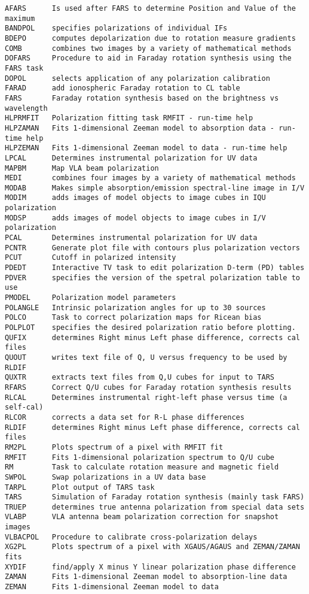 \vskip 0.5pt
\bbve\begin{verbatim}
AFARS      Is used after FARS to determine Position and Value of the maximum
BANDPOL    specifies polarizations of individual IFs
BDEPO      computes depolarization due to rotation measure gradients
COMB       combines two images by a variety of mathematical methods
DOFARS     Procedure to aid in Faraday rotation synthesis using the FARS task
DOPOL      selects application of any polarization calibration
FARAD      add ionospheric Faraday rotation to CL table
FARS       Faraday rotation synthesis based on the brightness vs wavelength
HLPRMFIT   Polarization fitting task RMFIT - run-time help
HLPZAMAN   Fits 1-dimensional Zeeman model to absorption data - run-time help
HLPZEMAN   Fits 1-dimensional Zeeman model to data - run-time help
LPCAL      Determines instrumental polarization for UV data
MAPBM      Map VLA beam polarization
MEDI       combines four images by a variety of mathematical methods
MODAB      Makes simple absorption/emission spectral-line image in I/V
MODIM      adds images of model objects to image cubes in IQU polarization
MODSP      adds images of model objects to image cubes in I/V polarization
PCAL       Determines instrumental polarization for UV data
PCNTR      Generate plot file with contours plus polarization vectors
PCUT       Cutoff in polarized intensity
PDEDT      Interactive TV task to edit polarization D-term (PD) tables
PDVER      specifies the version of the spetral polarization table to use
PMODEL     Polarization model parameters
POLANGLE   Intrinsic polarization angles for up to 30 sources
POLCO      Task to correct polarization maps for Ricean bias
POLPLOT    specifies the desired polarization ratio before plotting.
QUFIX      determines Right minus Left phase difference, corrects cal files
QUOUT      writes text file of Q, U versus frequency to be used by RLDIF
QUXTR      extracts text files from Q,U cubes for input to TARS
RFARS      Correct Q/U cubes for Faraday rotation synthesis results
RLCAL      Determines instrumental right-left phase versus time (a self-cal)
RLCOR      corrects a data set for R-L phase differences
RLDIF      determines Right minus Left phase difference, corrects cal files
RM2PL      Plots spectrum of a pixel with RMFIT fit
RMFIT      Fits 1-dimensional polarization spectrum to Q/U cube
RM         Task to calculate rotation measure and magnetic field
SWPOL      Swap polarizations in a UV data base
TARPL      Plot output of TARS task
TARS       Simulation of Faraday rotation synthesis (mainly task FARS)
TRUEP      determines true antenna polarization from special data sets
VLABP      VLA antenna beam polarization correction for snapshot images
VLBACPOL   Procedure to calibrate cross-polarization delays
XG2PL      Plots spectrum of a pixel with XGAUS/AGAUS and ZEMAN/ZAMAN fits
XYDIF      find/apply X minus Y linear polarization phase difference
ZAMAN      Fits 1-dimensional Zeeman model to absorption-line data
ZEMAN      Fits 1-dimensional Zeeman model to data
\end{verbatim}\eve

